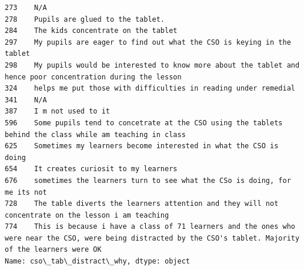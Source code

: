 \documentclass[11pt]{article}
\begin{document}
\begin{Verbatim}[commandchars=\\\{\}]
273    N/A                                                                                                                                                                                         
278    Pupils are glued to the tablet.                                                                                                                                                             
284    The kids concentrate on the tablet                                                                                                                                                          
297    My pupils are eager to find out what the CSO is keying in the tablet                                                                                                                        
298    My pupils would be interested to know more about the tablet and hence poor concentration during the lesson                                                                                  
324    helps me put those with difficulties in reading under remedial                                                                                                                              
341    N/A                                                                                                                                                                                         
387    I m not used to it                                                                                                                                                                          
596    Some pupils tend to concetrate at the CSO using the tablets behind the class while am teaching in class                                                                                     
625    Sometimes my learners become interested in what the CSO is doing                                                                                                                            
654    It creates curiosit to my learners                                                                                                                                                          
676    sometimes the learners turn to see what the CSo is doing, for me its not                                                                                                                    
728    The table diverts the learners attention and they will not concentrate on the lesson i am teaching                                                                                          
774    This is because i have a class of 71 learners and the ones who were near the CSO, were being distracted by the CSO's tablet. Majority of the learners were OK                               
Name: cso\_tab\_distract\_why, dtype: object

    \end{Verbatim}
\end{document}
